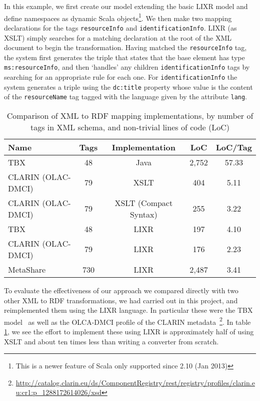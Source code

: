 \documentclass{llncs}
\begin{document}
In this example, we first create our model extending the basic LIXR model and
define namespaces as dynamic Scala objects\footnote{This is a newer feature of
    Scala only supported since 2.10 (Jan 2013)}. We then make two mapping
declarations for the tags {\tt resourceInfo} and {\tt identificationInfo}. LIXR (as 
XSLT) simply searches for a matching declaration at the root of the XML document
to begin the transformation. Having matched the {\tt resourceInfo} tag, the system
first generates the triple that states that the base element has type
{\tt ms:resourceInfo}, and then `handles' any children {\tt identificationInfo} tags by
searching for an appropriate rule for each one. For {\tt identificationInfo} the
system generates a triple using the {\tt dc:title} property whose value is the
content of the {\tt resourceName} tag tagged with the language given by the
attribute {\tt lang}.

\begin{table}
    \begin{center}
    \begin{tabular}{p{4cm}|cccc}
        Name        & Tags      & Implementation & LoC    & LoC/Tag \\
        \hline
        TBX         & 48        & Java           & 2,752  & 57.33   \\
        CLARIN (OLAC-DMCI) & 79 & XSLT           & 404    & 5.11    \\
        CLARIN (OLAC-DMCI) & 79 & XSLT (Compact Syntax) & 255    & 3.22    \\
        \hline
        TBX         & 48        & LIXR           & 197    & 4.10    \\
        CLARIN (OLAC-DMCI) & 79 & LIXR           & 176    & 2.23    \\
        MetaShare   & 730       & LIXR           & 2,487  & 3.41    \\
    \end{tabular}
\end{center}
    \caption{\label{tab:locs}Comparison of XML to RDF mapping implementations,
    by number of tags in XML schema, and non-trivial lines of code (LoC)}
\end{table}

To evaluate the effectiveness of our approach we compared directly with two other
XML to RDF transformations, we had carried out in this project, and
reimplemented them using the LIXR language. In particular these were the TBX
model~\cite{iso30042} as well as the OLCA-DMCI profile of the CLARIN
metadata~\footnote{\url{http://catalog.clarin.eu/ds/ComponentRegistry/rest/registry/profiles/clarin.eu:cr1:p\_1288172614026/xsd}}. In table \ref{tab:locs}, we see the
effort to implement these using LIXR is approximately half of using XSLT and
about ten times less than writing a converter from scratch. 
\end{document}
